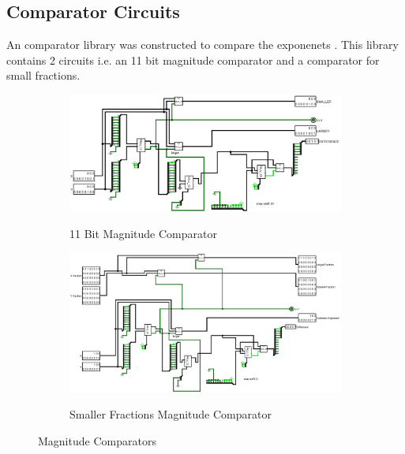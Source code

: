 \documentclass[12pt]{article}
\begin{document}
\subsection{Comparator Circuits}
An comparator library was constructed to compare the exponenets . This library contains 2 circuits i.e. an 11 bit magnitude comparator and a comparator for small fractions.
\begin{figure}[H]
    \centering
    \begin{subfigure}{\textwidth}
    \includegraphics[width=\textwidth]
        {images/Comparator_11_bit.jpg}
        \label{fig:11bitmagcomp}
    \caption{11 Bit Magnitude Comparator}
        
    \end{subfigure}
    \begin{subfigure}{\textwidth}
    \includegraphics[width=\textwidth]
        {images/Comparator_With_Smaller_Fraction.jpg}
        \label{fig:smfracmagcomp}
    \caption{Smaller Fractions Magnitude Comparator}
        
    \end{subfigure}
    \label{fig:magcomps}
    \caption{Magnitude Comparators}
        
\end{figure}
\newpage
\end{document}
